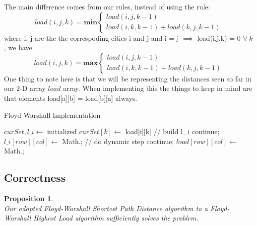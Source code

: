\documentclass[12pt]{article}
\newtheorem{proposition}[theorem]{Proposition}
\begin{document}
The main difference comes from our rules, instead of using the rule:
\[ load(i, j, k) = \textbf{min}
\begin{cases}
    load(i, j, k-1) \\
    load(i, k, k-1) + load(k, j, k-1)
\end{cases}
\]
where i, j are the the correspoding cities i and j and i = j $\implies$ load(i,j,k) = 0 $\forall\ k$, we have
\[ load(i, j, k) = \textbf{max}
\begin{cases}
    load(i, j, k-1) \\
    load(i, k, k-1) + load(k, j, k-1)
\end{cases}
\]
One thing to note here is that we will be representing the distances seen so far in our
2-D array $load$ array. When implementing this the things to keep in mind are that
elements load[a][b] = load[b][a] always.

\begin{algorithm}[H]
\caption{Floyd-Warshall Implementation}
\begin{algorithmic}
        \State $curSet, l\_i \gets$ initialized
                \State $curSet[k] \gets$ load[i][k]
            \EndFor
            \State // build l\_i
                        continue;
                    \EndIf
                    \State $l\_i[row][col] \gets$ Math.;
                \EndFor
            \EndFor
            \State // do dynamic step
                        continue;
                    \EndIf
                    \State $load[row][col] \gets$ Math.;
                \EndFor
            \EndFor
        \EndFor
    \EndProcedure
\end{algorithmic}
\end{algorithm}


\subsection{Correctness}
\begin{proposition}
~ \\ \indent Our adapted Floyd-Warshall Shortest Path Distance algorithm to a Floyd-Warshall
Highest Load algorithm sufficiently solves the problem.
\end{proposition}
\end{document}
